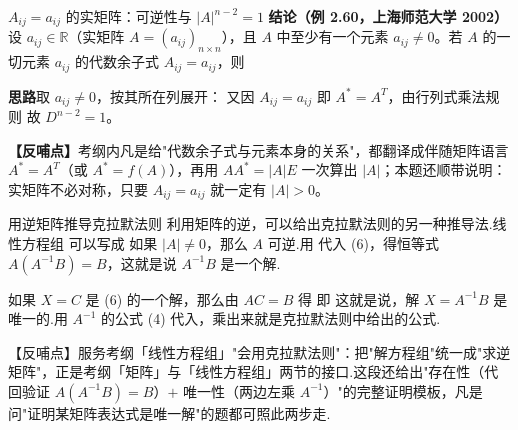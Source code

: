 \begin{fdeep}{$A_{ij}=a_{ij}$ 的实矩阵：可逆性与 $|A|^{n-2}=1$}
\textbf{结论（例 2.60，上海师范大学 2002）}\quad 设 $a_{ij}\in\mathbb{R}$（实矩阵 $A=(a_{ij})_{n\times n}$），且 $A$ 中至少有一个元素 $a_{ij}\neq0$。若 $A$ 的一切元素 $a_{ij}$ 的代数余子式 $A_{ij}=a_{ij}$，则

\textbf{思路}\quad 取 $a_{ij}\neq0$，按其所在列展开：
又因 $A_{ij}=a_{ij}$ 即 $A^{*}=A^{T}$，由行列式乘法规则
故 $D^{n-2}=1$。

\textbf{【反哺点】}考纲内凡是给"代数余子式与元素本身的关系"，都翻译成伴随矩阵语言 $A^{*}=A^{T}$（或 $A^{*}=f(A)$），再用 $AA^{*}=|A|E$ 一次算出 $|A|$；本题还顺带说明：实矩阵不必对称，只要 $A_{ij}=a_{ij}$ 就一定有 $|A|>0$。
\end{fdeep}


\begin{fdeep}{用逆矩阵推导克拉默法则}
利用矩阵的逆，可以给出克拉默法则的另一种推导法.线性方程组
可以写成
如果 $|A|\ne 0$，那么 $A$ 可逆.用
代入 (6)，得恒等式 $A(A^{-1}B)=B$，这就是说 $A^{-1}B$ 是一个解.

如果 $X=C$ 是 (6) 的一个解，那么由 $AC=B$ 得
即
这就是说，解 $X=A^{-1}B$ 是唯一的.用 $A^{-1}$ 的公式 (4) 代入，乘出来就是克拉默法则中给出的公式.

【反哺点】服务考纲「线性方程组」"会用克拉默法则"：把"解方程组"统一成"求逆矩阵"，正是考纲「矩阵」与「线性方程组」两节的接口.这段还给出"存在性（代回验证 $A(A^{-1}B)=B$）$+$ 唯一性（两边左乘 $A^{-1}$）"的完整证明模板，凡是问"证明某矩阵表达式是唯一解"的题都可照此两步走.
\end{fdeep}